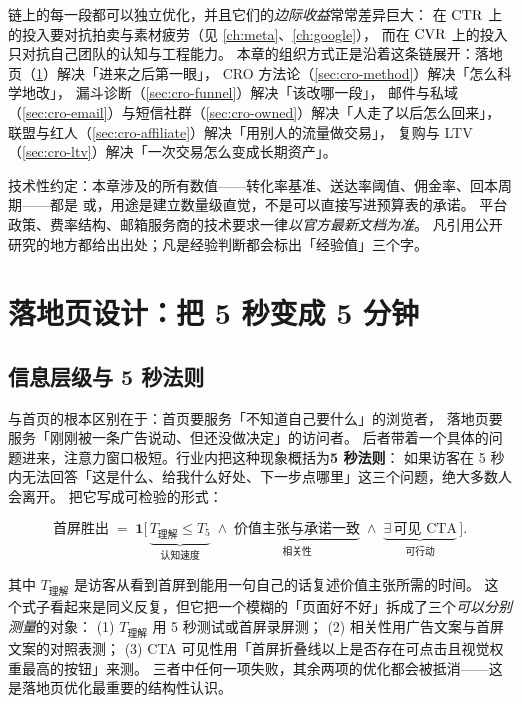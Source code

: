 链上的每一段都可以独立优化，并且它们的\emph{边际收益}常常差异巨大：
在 $\operatorname{CTR}$ 上的投入要对抗拍卖与素材疲劳（见 \cref{ch:meta}、\cref{ch:google}），
而在 $\operatorname{CVR}$ 上的投入只对抗自己团队的认知与工程能力。
本章的组织方式正是沿着这条链展开：落地页（\cref{sec:cro-lp}）解决「进来之后第一眼」，
CRO 方法论（\cref{sec:cro-method}）解决「怎么科学地改」，
漏斗诊断（\cref{sec:cro-funnel}）解决「该改哪一段」，
邮件与私域（\cref{sec:cro-email}）与短信社群（\cref{sec:cro-owned}）解决「人走了以后怎么回来」，
联盟与红人（\cref{sec:cro-affiliate}）解决「用别人的流量做交易」，
复购与 LTV（\cref{sec:cro-ltv}）解决「一次交易怎么变成长期资产」。

技术性约定：本章涉及的所有数值——转化率基准、送达率阈值、佣金率、回本周期——都是
或，用途是建立数量级直觉，不是可以直接写进预算表的承诺。
平台政策、费率结构、邮箱服务商的技术要求一律\emph{以官方最新文档为准}。
凡引用公开研究的地方都给出出处；凡是经验判断都会标出「经验值」三个字。

\section{落地页设计：把 5 秒变成 5 分钟}
\label{sec:cro-lp}

\subsection{信息层级与 5 秒法则}

 与首页的根本区别在于：首页要服务「不知道自己要什么」的浏览者，
落地页要服务「刚刚被一条广告说动、但还没做决定」的访问者。
后者带着一个具体的问题进来，注意力窗口极短。行业内把这种现象概括为\textbf{5 秒法则}：
如果访客在 5 秒内无法回答「这是什么、给我什么好处、下一步点哪里」这三个问题，绝大多数人会离开。
把它写成可检验的形式：

\begin{equation}
\text{首屏胜出} \;=\; \mathbf{1}\Big[\, \underbrace{T_{\text{理解}} \le T_{5}}_{\text{认知速度}} \;\wedge\; \underbrace{\text{价值主张与承诺一致}}_{\text{相关性}} \;\wedge\; \underbrace{\exists\, \text{可见 CTA}}_{\text{可行动}} \,\Big] .
\label{eq:five-second}
\end{equation}

其中 $T_{\text{理解}}$ 是访客从看到首屏到能用一句自己的话复述价值主张所需的时间。
这个式子看起来是同义反复，但它把一个模糊的「页面好不好」拆成了三个\emph{可以分别测量}的对象：
(1) $T_{\text{理解}}$ 用 5 秒测试或首屏录屏测；
(2) 相关性用广告文案与首屏文案的对照表测；
(3) CTA 可见性用「首屏折叠线以上是否存在可点击且视觉权重最高的按钮」来测。
三者中任何一项失败，其余两项的优化都会被抵消——这是落地页优化最重要的结构性认识。

